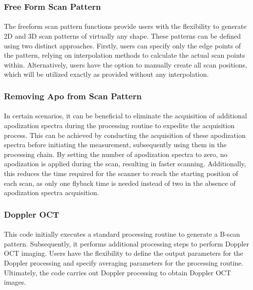 \subsubsection{Free Form Scan Pattern}
\paragraph{}
The freeform scan pattern functions provide users with the flexibility to generate 2D and 3D scan patterns of virtually any shape. These patterns can be defined using two distinct approaches. Firstly, users can specify only the edge points of the pattern, relying on interpolation methods to calculate the actual scan points within. Alternatively, users have the option to manually create all scan positions, which will be utilized exactly as provided without any interpolation. 

\subsubsection{Removing Apo from Scan Pattern}
\paragraph{}
In certain scenarios, it can be beneficial to eliminate the acquisition of additional apodization spectra during the processing routine to expedite the acquisition process. This can be achieved by conducting the acquisition of these apodization spectra before initiating the measurement, subsequently using them in the processing chain. By setting the number of apodization spectra to zero, no apodization is applied during the scan, resulting in faster scanning. Additionally, this reduces the time required for the scanner to reach the starting position of each scan, as only one flyback time is needed instead of two in the absence of apodization spectra acquisition.

\subsubsection{Doppler OCT}
\paragraph{}
This code initially executes a standard processing routine to generate a B-scan pattern. Subsequently, it performs additional processing steps to perform Doppler OCT imaging. Users have the flexibility to define the output parameters for the Doppler processing and specify averaging parameters for the processing routine. Ultimately, the code carries out Doppler processing to obtain Doppler OCT images.

